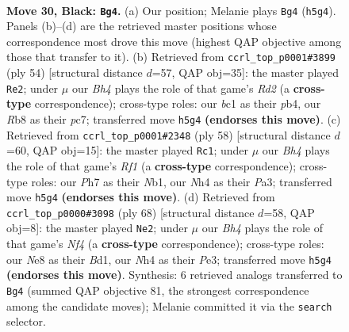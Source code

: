 \documentclass[11pt]{article}
\begin{document}
\clearpage

\begin{figure}[p]\centering
\begin{subfigure}{0.46\textwidth}\centering
\resizebox{\linewidth}{!}{%
\newchessgame
\chessboard[
  setfen={1r2n1k1/2p2p1p/p1P3p1/P3p2b/7n/8/2B3P1/RNB3K1 b - - 0 30},
  showmover=false,
  pgfstyle=straightmove, color=movearrow, markmove={h5-g4}
]}
\caption{}
\end{subfigure}\hfill
\begin{subfigure}{0.46\textwidth}\centering
\resizebox{\linewidth}{!}{%
\newchessgame
\chessboard[
  setfen={2r5/1bp3pp/p3k3/5p1P/Pp6/1P2N3/1P1R1PP1/6K1 w - - 0 28},
  showmover=false,
  pgfstyle=straightmove, color=movearrow, markmove={d2-e2}
]}
\caption{}
\end{subfigure}
\\[4pt]
\begin{subfigure}{0.46\textwidth}\centering
\resizebox{\linewidth}{!}{%
\newchessgame
\chessboard[
  setfen={2r1n1k1/pp4p1/7p/b1Pp4/5PPN/P3P2P/6K1/1N3R2 w - - 0 30},
  showmover=false,
  pgfstyle=straightmove, color=movearrow, markmove={f1-c1}
]}
\caption{}
\end{subfigure}\hfill
\begin{subfigure}{0.46\textwidth}\centering
\resizebox{\linewidth}{!}{%
\newchessgame
\chessboard[
  setfen={2b4k/2r2p2/5n1p/3p2p1/5N2/4P2P/5PP1/1R1B2K1 w - - 0 35},
  showmover=false,
  pgfstyle=straightmove, color=movearrow, markmove={f4-e2}
]}
\caption{}
\end{subfigure}
\caption{\textbf{Move 30, Black: \texttt{Bg4}.} (a) Our position; Melanie plays \texttt{Bg4} (\texttt{h5g4}). Panels (b)--(d) are the retrieved master positions whose correspondence most drove this move (highest QAP objective among those that transfer to it). (b) Retrieved from \texttt{ccrl\_top\_p0001\#3899} (ply 54) [structural distance $d$=57, QAP obj=35]: the master played \texttt{Re2}; under $\mu$ our \emph{Bh4} plays the role of that game's \emph{Rd2} (a \textbf{cross-type} correspondence); cross-type roles: our \emph{b}c1 as their \emph{p}b4, our \emph{R}b8 as their \emph{p}c7; transferred move \texttt{h5g4} \textbf{(endorses this move)}. (c) Retrieved from \texttt{ccrl\_top\_p0001\#2348} (ply 58) [structural distance $d$=60, QAP obj=15]: the master played \texttt{Rc1}; under $\mu$ our \emph{Bh4} plays the role of that game's \emph{Rf1} (a \textbf{cross-type} correspondence); cross-type roles: our \emph{P}h7 as their \emph{N}b1, our \emph{N}h4 as their \emph{P}a3; transferred move \texttt{h5g4} \textbf{(endorses this move)}. (d) Retrieved from \texttt{ccrl\_top\_p0000\#3098} (ply 68) [structural distance $d$=58, QAP obj=8]: the master played \texttt{Ne2}; under $\mu$ our \emph{Bh4} plays the role of that game's \emph{Nf4} (a \textbf{cross-type} correspondence); cross-type roles: our \emph{N}e8 as their \emph{B}d1, our \emph{N}h4 as their \emph{P}e3; transferred move \texttt{h5g4} \textbf{(endorses this move)}. Synthesis: 6 retrieved analogs transferred to \texttt{Bg4} (summed QAP objective 81, the strongest correspondence among the candidate moves); Melanie committed it via the \texttt{search} selector.}
\label{fig:thought-m59}
\end{figure}
\end{document}
